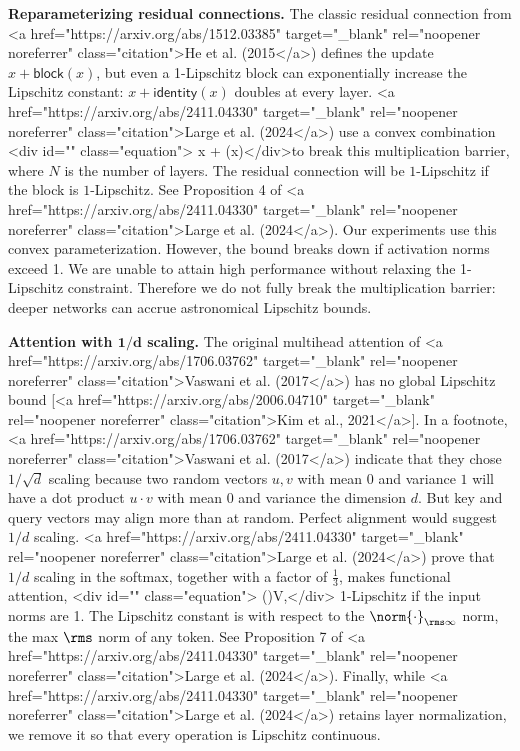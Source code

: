 \textbf{Reparameterizing residual connections.} The classic residual connection from <a href="https://arxiv.org/abs/1512.03385" target="_blank" rel="noopener noreferrer" class="citation">He et al. (2015</a>) defines the update $x + \mathsf{block}(x)$, but even a 1-Lipschitz block can exponentially increase the Lipschitz constant: $x + \mathsf{identity}(x)$ doubles at every layer. <a href="https://arxiv.org/abs/2411.04330" target="_blank" rel="noopener noreferrer" class="citation">Large et al. (2024</a>) use a convex combination <div id="" class="equation">    \label{eq:breaking-barrier-convex-combination}
     \cdot x +  \cdot{}(x)</div>to break this multiplication barrier,  where $N$ is the number of layers. The residual connection will be $1$-Lipschitz if the block is $1$-Lipschitz. See Proposition 4 of <a href="https://arxiv.org/abs/2411.04330" target="_blank" rel="noopener noreferrer" class="citation">Large et al. (2024</a>). Our experiments use this convex parameterization. However, the bound breaks down if activation norms exceed 1. We are unable to attain high performance without relaxing the 1-Lipschitz constraint. Therefore we do not fully break the multiplication barrier: deeper networks can accrue astronomical Lipschitz bounds.

\textbf{Attention with $\boldsymbol{1/d}$ scaling.} The original multihead attention of <a href="https://arxiv.org/abs/1706.03762" target="_blank" rel="noopener noreferrer" class="citation">Vaswani et al. (2017</a>) has no global Lipschitz bound [<a href="https://arxiv.org/abs/2006.04710" target="_blank" rel="noopener noreferrer" class="citation">Kim et al., 2021</a>]. In a footnote, <a href="https://arxiv.org/abs/1706.03762" target="_blank" rel="noopener noreferrer" class="citation">Vaswani et al. (2017</a>) indicate that they chose $1/\sqrt{d}$ scaling because two random vectors $u, v$ with mean $0$ and variance $1$ will have a dot product $u \cdot v$ with mean $0$ and variance the dimension $d$. But key and query vectors may align more than at random. Perfect alignment would suggest $1/d$ scaling. <a href="https://arxiv.org/abs/2411.04330" target="_blank" rel="noopener noreferrer" class="citation">Large et al. (2024</a>) prove that $1/d$ scaling in the softmax, together with a factor of $\tfrac13$, makes functional attention, <div id="" class="equation">    \label{eq:breaking-barrier-softmax-1-d}
     \times {}\left(\right)V,</div> 1-Lipschitz if the input norms are 1. The Lipschitz constant is with respect to the $\norm{\cdot}_{\rms\infty}$ norm, the max $\rms$ norm of any token. See Proposition 7 of <a href="https://arxiv.org/abs/2411.04330" target="_blank" rel="noopener noreferrer" class="citation">Large et al. (2024</a>). Finally, while <a href="https://arxiv.org/abs/2411.04330" target="_blank" rel="noopener noreferrer" class="citation">Large et al. (2024</a>) retains layer normalization, we remove it so that every operation is Lipschitz continuous.

